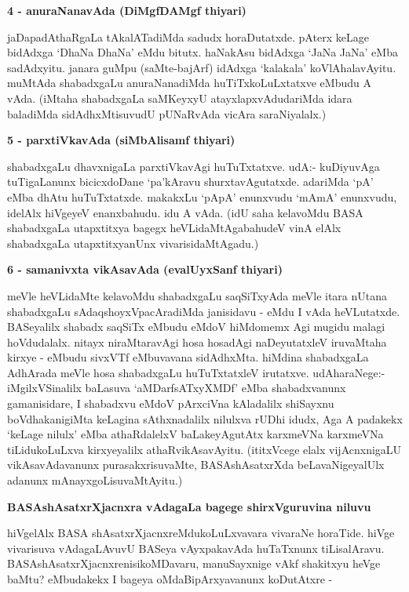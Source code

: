 {\bigskip
\noindent
{\large\bf 4 - anuraNanavAda (DiMgfDAMgf thiyari)}}
\medskip

\noindent
jaDapadAthaRgaLa tAkalATadiMda sadudx horaDutatxde. pAterx keLage bidAdxga `DhaNa DhaNa' eMdu bitutx. haNakAsu bidAdxga `JaNa JaNa' eMba sadAdxyitu. janara guMpu (saMte-bajArf) idAdxga `kalakala' koVlAhalavAyitu. muMtAda shabadxgaLu anuraNanadiMda huTiTxkoLuLxtatxve eMbudu A vAda. (iMtaha shabadxgaLa saMKeyxyU atayxlapxvAdudariMda idara baladiMda sidAdhxMtisuvudU pUNaRvAda vicAra saraNiyalalx.)

{\bigskip
\noindent
{\large\bf 5 - parxtiVkavAda (siMbAlisamf thiyari)}}
\medskip

\noindent
shabadxgaLu dhavxnigaLa parxtiVkavAgi huTuTxtatxve. udA:- kuDiyuvAga tuTigaLanunx bicicxdoDane `pa'kAravu shurxtavAgutatxde. adariMda `pA' eMba dhAtu huTuTxtatxde. makakxLu `pApA' enunxvudu `mAmA' enunxvudu, idelAlx hiVgeyeV enanxbahudu. idu A vAda. (idU saha kelavoMdu BASA shabadxgaLa utapxtitxya bagegx heVLidaMtAgabahudeV vinA elAlx shabadxgaLa utapxtitxyanUnx vivarisidaMtAgadu.)

{\bigskip
\noindent
{\large\bf 6 - samanivxta vikAsavAda (evalUyxSanf thiyari)}}
\medskip

\noindent
meVle heVLidaMte kelavoMdu shabadxgaLu saqSiTxyAda meVle itara nUtana shabadxgaLu sAdaqshoyxVpacAradiMda janisidavu - eMdu I vAda heVLutatxde. BASeyalilx shabadx saqSiTx eMbudu eMdoV hiMdomemx Agi mugidu malagi hoVdudalalx. nitayx niraMtaravAgi hosa hosadAgi naDeyutatxleV iruvaMtaha kirxye - eMbudu sivxVTf eMbuvavana sidAdhxMta. hiMdina shabadxgaLa AdhArada meVle hosa shabadxgaLu huTuTxtatxleV irutatxve. udAharaNege:- iMgilxVSinalilx baLasuva `aMDarfsATxyXMDf' eMba shabadxvanunx gamanisidare, I shabadxvu eMdoV pArxciVna kAladalilx shiSayxnu boVdhakanigiMta keLagina sAthxnadalilx nilulxva rUDhi idudx, Aga A padakekx `keLage nilulx' eMba athaRdalelxV baLakeyAgutAtx karxmeVNa karxmeVNa tiLidukoLuLxva kirxyeyalilx athaRvikAsavAyitu. (ititxVcege elalx vijAcnxnigaLU vikAsavAdavanunx purasakxrisuvaMte, BASAshAsatxrXda beLavaNigeyalUlx adanunx mAnayxgoLisuvaMtAyitu.)

{\bigskip
\noindent
{\large\bf BASAshAsatxrXjacnxra vAdagaLa bagege shirxVguruvina niluvu}}\label{page5}
\medskip

\noindent
hiVgelAlx BASA shAsatxrXjacnxreMdukoLuLxvavara vivaraNe horaTide. hiVge vivarisuva vAdagaLAvuvU BASeya vAyxpakavAda huTaTxnunx tiLisalAravu. BASAshAsatxrXjacnxrenisikoMDavaru, manuSayxnige vAkf shakitxyu heVge baMtu? eMbudakekx I bageya oMdaBipArxyavanunx koDutAtxre - 

